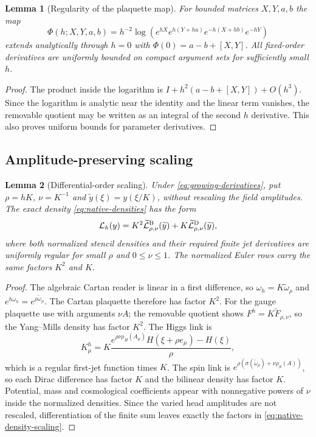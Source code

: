 \documentclass[11pt]{article}
\numberwithin{equation}{section}
\newtheorem{lemma}[lemma]{Lemma}
\theoremstyle{definition}
\theoremstyle{remark}
\begin{document}
\begin{lemma}[Regularity of the plaquette map]
\label{lem:native-plaquette}
For bounded matrices $X,Y,a,b$ the map
\[
 \Phi(h;X,Y,a,b)=h^{-2}\log(e^{hX}e^{h(Y+ha)}e^{-h(X+hb)}e^{-hY})
\]
extends analytically through $h=0$ with $\Phi(0)=a-b+[X,Y]$.  All fixed-order derivatives are uniformly bounded on compact argument sets for sufficiently small $h$.
\end{lemma}
\begin{proof}
The product inside the logarithm is $I+h^2(a-b+[X,Y])+O(h^3)$.  Since the logarithm is analytic near the identity and the linear term vanishes, the removable quotient may be written as an integral of the second $h$ derivative.  This also proves uniform bounds for parameter derivatives.
\end{proof}

\subsection{Amplitude-preserving scaling}
\label{app:native-scaling}

\begin{lemma}[Differential-order scaling]
\label{lem:native-scaling}
Under \eqref{eq:growing-derivatives}, put $\rho=hK$, $\nu=K^{-1}$ and $\widetilde y(\xi)=y(\xi/K)$, without rescaling the field amplitudes.  The exact density \eqref{eq:native-densities} has the form
\begin{equation}
 \mathcal L_h(y)=K^2\widetilde{\mathcal L}^{\rm B}_{\rho,\nu}(\widetilde y)
 +K\widetilde{\mathcal L}^{\rm D}_{\rho,\nu}(\widetilde y),
 \label{eq:native-density-scaling}
\end{equation}
where both normalized stencil densities and their required finite jet derivatives are uniformly regular for small $\rho$ and $0\le\nu\le1$.  The normalized Euler rows carry the same factors $K^2$ and $K$.
\end{lemma}
\begin{proof}
The algebraic Cartan reader is linear in a first difference, so $\omega_h=K\widetilde\omega_\rho$ and $e^{h\omega_h}=e^{\rho\widetilde\omega_\rho}$.  The Cartan plaquette therefore has factor $K^2$.  For the gauge plaquette use  with arguments $\nu A$; the removable quotient shows $F^h=K\widetilde F_{\rho,\nu}$, so the Yang--Mills density has factor $K^2$.  The Higgs link is
\[
 K^h_\mu=K\frac{e^{\rho\nu\rho_H(A_\mu)}H(\xi+\rho e_\mu)-H(\xi)}\rho,
\]
which is a regular first-jet function times $K$.  The spin link is
$e^{\rho(\sigma(\widetilde\omega_\rho)+\nu\rho_S(A))}$, so each Dirac difference has factor $K$ and the bilinear density has factor $K$.  Potential, mass and cosmological coefficients appear with nonnegative powers of $\nu$ inside the normalized densities.  Since the varied head amplitudes are not rescaled, differentiation of the finite sum leaves exactly the factors in \eqref{eq:native-density-scaling}.
\end{proof}
\end{document}
